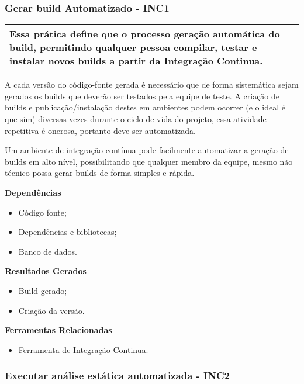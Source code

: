 \subsubsection{Gerar build Automatizado - INC1}
\label{sec:inc1}

\begin{table}[!ht]
\centering
\begin{tabular}{|p{130mm}|}
\hline
Essa prática define que o processo geração automática do build, permitindo qualquer pessoa compilar, testar e instalar novos builds a partir da Integração Continua. \\
\hline
\end{tabular}
\end{table}

A cada versão do código-fonte gerada é necessário que de forma sistemática sejam gerados os builds que deverão ser testados pela equipe de teste. A criação de builds e publicação/instalação destes em ambientes podem ocorrer (e o ideal é que sim) diversas vezes durante o ciclo de vida do projeto, essa atividade repetitiva é onerosa, portanto deve ser automatizada.

Um ambiente de integração contínua pode facilmente automatizar a geração de builds em alto nível, possibilitando que qualquer membro da equipe, mesmo não técnico possa gerar builds de forma simples e rápida.

\textbf{Dependências}
\begin{itemize}
    \item Código fonte;
    \item Dependências e bibliotecas;
    \item Banco de dados.
\end{itemize}

\textbf{ Resultados Gerados }
\begin{itemize}
    \item Build gerado;
    \item Criação da versão.
\end{itemize}

\textbf{ Ferramentas Relacionadas }
\begin{itemize}
    \item Ferramenta de Integração Continua.
\end{itemize}

\subsubsection{Executar análise estática automatizada - INC2}
\label{sec:inc2}

